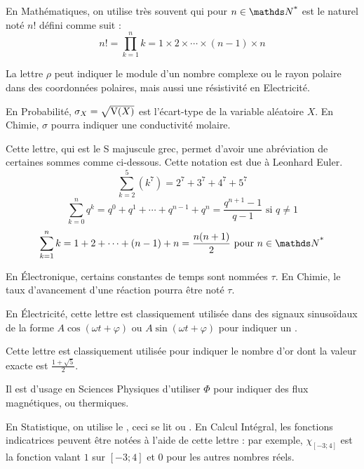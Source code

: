 \noindent En Mathématiques, on utilise très souvent  qui pour $ n \in \NN^{\text{*}}$ est le naturel noté $n!$ \label{factoriel} défini comme suit :
\begin{equation}
	n! = \prod_{k = 1}^{n} k = 1 \times 2 \times \cdots \times(n-1) \times n
\end{equation}

\cadre{$\rho$} La lettre $\rho$ peut indiquer le module d’un nombre complexe ou le rayon polaire dans des coordonnées polaires, mais aussi une résistivité en Electricité.

\cadre{$\sigma$} En Probabilité, $\sigma_X = \sqrt{\mathrm{V}(X)}$ est l'écart-type de la variable aléatoire $X$. En Chimie, $\sigma$ pourra indiquer une conductivité molaire.

\cadre{$\Sigma$} Cette lettre, qui est le S majuscule grec, permet d'avoir une abréviation de certaines sommes comme ci-dessous. Cette notation est due à Leonhard Euler.
\begin{equation}
	\sum_{k = 2}^{5} \left( k^7 \right) = 2^7 + 3^7 + 4^7 + 5^7
\end{equation}
\begin{equation}
	\sum_{k = 0}^{n} q^k = q^0 + q^1  + \cdots + q^{n-1} + q^n = \frac{q^{n+1} - 1}{q - 1} \text{ si } q \neq 1
\end{equation}
\begin{equation}
	\sum_{k = 1}^{n} k = 1 + 2 + \cdots + (n-1) + n = \frac{n (n + 1)}{2}  \text{ pour } n \in \NNs
\end{equation}

\cadre{$\tau$} En Électronique, certains constantes de temps sont nommées $\tau$. En Chimie, le taux d'avancement d'une réaction pourra être noté $\tau$.

\cadre{$\varphi$} En Électricité, cette lettre est classiquement utilisée dans des signaux sinusoïdaux de la forme $A\cos(\omega t + \varphi)$ ou $A\sin(\omega t + \varphi)$ pour indiquer un .

\cadre{$\phi$} Cette lettre est classiquement utilisée pour indiquer le nombre d'or dont la valeur exacte est $\frac{1 + \sqrt{5}}{2}$.

\cadre{$\Phi$} Il est d'usage en Sciences Physiques d'utiliser $\Phi$ pour indiquer des flux magnétiques, ou thermiques.

\cadre{$\chi$} En Statistique, on utilise le , ceci se lit  ou . En Calcul Intégral, les fonctions indicatrices peuvent être notées à l'aide de cette lettre : par exemple, $\chi_{[-3;4]}$ est la fonction valant $1$ sur $[-3;4]$ et $0$ pour les autres nombres réels.

